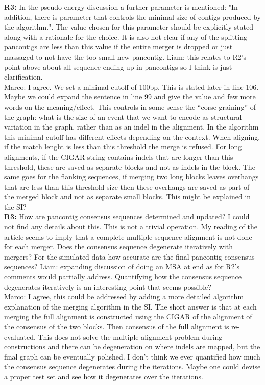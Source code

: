 \documentclass[aps,rmp,onecolumn]{revtex4-1}
\newcommand{\Marco}[1]{{\color{gray}Marco: #1}}
\newcommand{\Liam}[1]{{\color{teal}Liam: #1}}
\newcommand{\reviewer}[2]{\textbf{#1:} #2\vskip 5mm}
\begin{document}
\reviewer{R3}{In the pseudo-energy discussion a further parameter is mentioned: "In addition, there is parameter that controls the minimal size of contigs produced by the algorithm.". The value chosen for this parameter should be explicitly stated along with a rationale for the choice. It is also not clear if any of the splitting pancontigs are less than this value if the entire merger is dropped or just massaged to not have the too small new pancontig.}
\Liam{this relates to R2's point above about all sequence ending up in pancontigs so I think is just clarification.}\\
\Marco{I agree. We set a minimal cutoff of 100bp. This is stated later in line 106. Maybe we could expand the sentence in line 99 and give the value and few more words on the meaning/effect. This controls in some sense the ``corse graining'' of the graph: what is the size of an event that we want to encode as structural variation in the graph, rather than as an indel in the alignment. In the algorithm this minimal cutoff has different effects depending on the context. When aligning, if the match lenght is less than this threshold the merge is refused. For long alignments, if the CIGAR string contains indels that are longer than this threshold, these are saved as separate blocks and not as indels in the block. The same goes for the flanking sequences, if merging two long blocks leaves overhangs that are less than this threshold size then these overhangs are saved as part of the merged block and not as separate small blocks. This might be explained in the SI?}\\

\reviewer{R3}{How are pancontig consensus sequences determined and updated? I could not find any details about this. This is not a trivial operation. My reading of the article seems to imply that a complete multiple sequence alignment is not done for each merger. Does the consensus sequence degenerate iteratively with mergers? For the simulated data how accurate are the final pancontig consensus sequences?}
\Liam{expanding discussion of doing an MSA at end as for R2's comments would partially address. Quantifying how the consensus sequence degenerates iteratively is an interesting point that seems possible?}\\
\Marco{I agree, this could be addressed by adding a more detailed algorithm explanation of the merging algorithm in the SI. The short answer is that at each merging the full alignment is constructed using the CIGAR of the alignment of the consensus of the two blocks. Then consensus of the full alignment is re-evaluated. This does not solve the multiple alignment problem during constructions and there can be degeneration on where indels are mapped, but the final graph can be eventually polished. I don't think we ever quantified how much the consensus sequence degenerates during the iterations. Maybe one could devise a proper test set and see how it degenerates over the iterations.}\\
\end{document}
